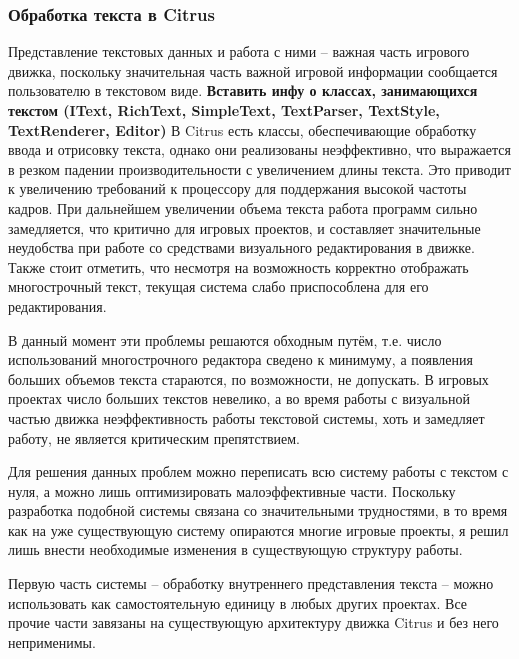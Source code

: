 \documentclass{fefu}
\begin{document}
			\subsubsection{Обработка текста в Citrus}
				\par Представление текстовых данных и работа с ними -- важная часть игрового
				движка, поскольку значительная часть важной игровой информации сообщается 
				пользователю в текстовом виде. \textbf{Вставить инфу о классах, занимающихся
				текстом (IText, RichText, SimpleText, TextParser, TextStyle, TextRenderer,
				Editor)} 
				В Citrus есть классы, обеспечивающие обработку ввода и отрисовку текста, 
				однако они реализованы неэффективно, что выражается в резком падении 
				производительности с увеличением длины текста. Это приводит к увеличению
				требований к процессору для поддержания высокой частоты кадров. При дальнейшем
				увеличении объема текста работа программ сильно замедляется, что критично для
				игровых проектов, и составляет значительные неудобства при работе со средствами
				визуального редактирования в движке. Также стоит отметить, что несмотря на
				возможность корректно отображать многострочный текст, текущая система слабо
				приспособлена для его редактирования.
				\par В данный момент эти проблемы решаются обходным путём, т.е. число
				использований многострочного редактора сведено к минимуму, а появления больших
				объемов текста стараются, по возможности, не допускать. В игровых проектах
				число больших текстов невелико, а во время работы с визуальной частью движка
				неэффективность работы текстовой системы, хоть и замедляет работу, не является
				критическим препятствием.
				\par Для решения данных проблем можно переписать всю систему работы с текстом с
				нуля, а можно лишь оптимизировать малоэффективные части. Поскольку разработка 
				подобной системы связана со значительными трудностями, в то время как на уже
				существующую систему опираются многие игровые проекты, я решил лишь внести 
				необходимые изменения в существующую структуру работы.
				\par Первую часть системы -- обработку внутреннего представления текста -- 
				можно использовать как самостоятельную единицу в любых других проектах. Все 
				прочие части завязаны на существующую архитектуру движка Citrus и без него 
				неприменимы.
\end{document}
